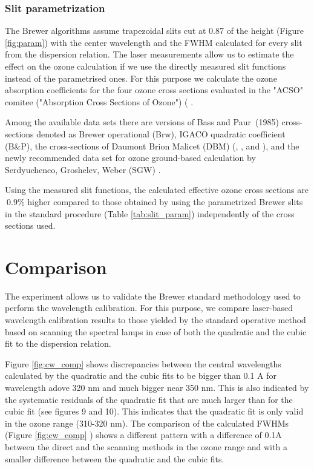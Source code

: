\documentclass[acp]{copernicus} %
\begin{document}
\subsubsection{Slit parametrization }

The Brewer algorithms assume trapezoidal slits cut at 0.87 of the height (Figure \ref{fig:param}) with the  center wavelength and the FWHM calculated for every slit from the dispersion relation. The laser measurements allow us to estimate the effect on the ozone calculation if we use the directly measured slit functions instead of the parametrised ones. For this purpose we calculate the ozone absorption coefficients for the four ozone cross sections evaluated in the  "ACSO" comitee ("Absorption Cross Sections of Ozone") ( \citet{orphal2016absorption}.

Among the available data sets there are versions of Bass and Paur~(1985) cross-sections denoted as Brewer operational (Brw), IGACO quadratic coefficient (B\&P), the cross-sections of  Daumont Brion Malicet (DBM) (\citet{ daumont_ozone_1992}, \citet{brion_high-resolution_1993}, and \citet{malicet_ozone_1995} ), and the newly recommended data set for ozone ground-based calculation by Serdyuchenco, Groshelev, Weber (SGW) \citep{serdyuchenko_high_2012,gorshelev_high_2012,amt-9-4459-2016}. 


Using the measured slit functions, the calculated effective ozone cross sections are $~0.9\%$ higher compared to those obtained by using the parametrized Brewer slits in the standard procedure (Table \ref{tab:slit_param}) independently of the cross sections used.


\section{Comparison }

The experiment allows us to validate the Brewer standard methodology used to perform the wavelength calibration. For this purpose, we compare laser-based wavelength calibration results to those yielded by the standard operative method based on scanning the spectral lamps in case of both the quadratic and the cubic fit to the dispersion relation.

Figure \ref{fig:cw_comp} shows discrepancies between the central wavelengths calculated by the quadratic and the cubic fits to be bigger than 0.1 A for wavelength adove 320 \unit{nm} and much bigger near 350 nm. This is  also indicated by the systematic residuals of the quadratic fit that are much larger than for the cubic fit (see figures 9 and 10). This indicates that the quadratic fit is only valid in the ozone range (310-320 nm). The comparison of the calculated FWHMs (Figure \ref{fig:cw_comp} ) shows a different pattern with a difference of 0.1A between the direct and the scanning methods in the ozone range and with a smaller difference between the quadratic and the cubic fits.  
\end{document}

